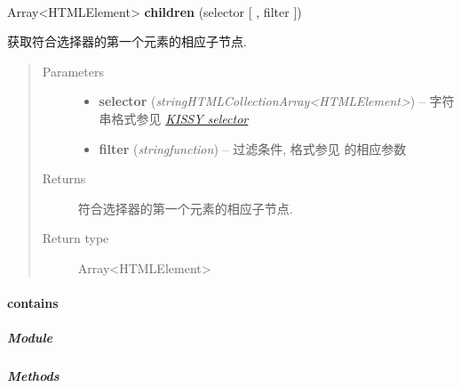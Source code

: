 \documentclass[letterpaper,10pt,english]{sphinxmanual}
\begin{document}
\begin{fulllineitems}
\label{api/core/dom/children:DOM.children}~
\begin{DUlineblock}{0em}
\item[] Array\textless{}HTMLElement\textgreater{} \textbf{children} (selector {[} , filter {]})
\item[] 获取符合选择器的第一个元素的相应子节点.
\end{DUlineblock}
\begin{quote}\begin{description}
\item[{Parameters}] \leavevmode\begin{itemize}
\item {}
\textbf{selector} (\emph{string\textbar{}HTMLCollection\textbar{}Array\textless{}HTMLElement\textgreater{}}) -- 字符串格式参见 {\hyperref[api/core/dom/selector:dom-selector]{\emph{KISSY selector}}}

\item {}
\textbf{filter} (\emph{string\textbar{}function}) -- 过滤条件, 格式参见 {\hyperref[api/core/dom/filter:DOM.filter]{}} 的相应参数

\end{itemize}

\item[{Returns}] \leavevmode
符合选择器的第一个元素的相应子节点.

\item[{Return type}] \leavevmode
Array\textless{}HTMLElement\textgreater{}

\end{description}\end{quote}

\end{fulllineitems}



\paragraph{contains}
\label{api/core/dom/contains:contains}\label{api/core/dom/contains::doc}

\subparagraph{Module}
\label{api/core/dom/contains:module}\begin{quote}

{\hyperref[api/core/dom/index:module-DOM]{}}
\end{quote}


\subparagraph{Methods}
\label{api/core/dom/contains:methods}
\end{document}
